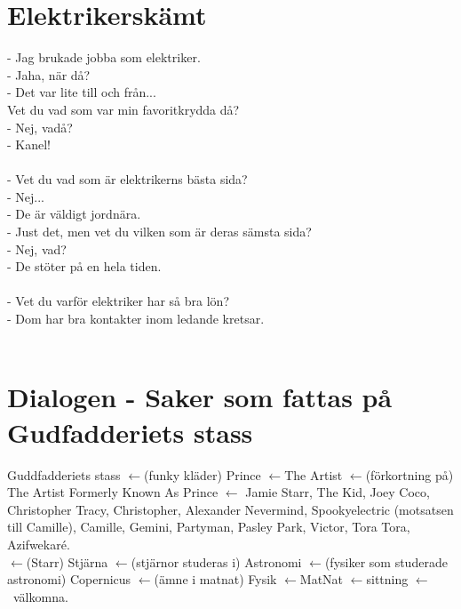 \documentclass{article}
\newcommand{\ib}{$\leftarrow$}
\begin{document}
\section{Elektrikerskämt}
\label{sec:elektrikerskamt}

- Jag brukade jobba som elektriker. \\
- Jaha, när då? \\
- Det var lite till och från... \\
 Vet du vad som var min favoritkrydda då?\\
- Nej, vadå? \\
- Kanel! \\
\\
- Vet du vad som är elektrikerns bästa sida? \\
- Nej...\\
- De är väldigt jordnära. \\
- Just det, men vet du vilken som är deras sämsta sida? \\
- Nej, vad? \\
- De stöter på en hela tiden.\\
\\
- Vet du varför elektriker har så bra lön? \\
- Dom har bra kontakter inom ledande kretsar. \\
\\

\clearpage
 
\section{Dialogen - Saker som fattas på Gudfadderiets stass}
\label{sec:dialogen}
Guddfadderiets stass \ib(funky kläder) Prince \ib The Artist \ib(förkortning på) The
Artist Formerly Known As Prince \ib
Jamie Starr, The Kid, Joey Coco, Christopher Tracy, Christopher,
Alexander Nevermind, Spookyelectric (motsatsen till Camille), Camille, Gemini, Partyman, Pasley
Park, Victor, Tora Tora, Azifwekaré. \\
\ib(Starr) Stjärna \ib (stjärnor studeras i) Astronomi \ib (fysiker som
studerade astronomi) Copernicus \ib (ämne i matnat) Fysik \ib MatNat
\ib sittning \ib\ välkomna.
\end{document}
